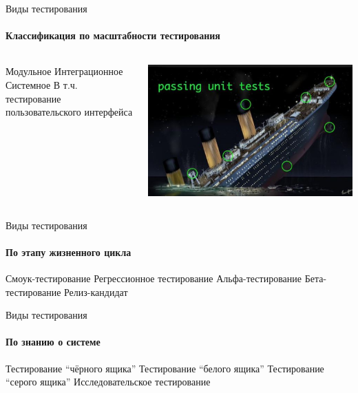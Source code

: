 \documentclass{../../slides-style}
\begin{document}
    \begin{frame}{Виды тестирования}
        \framesubtitle{Классификация по масштабности тестирования}
        \begin{columns}
            \begin{column}{0.4\textwidth}
                \begin{outline}
                    \1 Модульное
                    \1 Интеграционное
                    \1 Системное
                        \2 В т.ч. тестирование пользовательского интерфейса
                \end{outline}
            \end{column}
            \begin{column}{0.6\textwidth}
                \begin{center}
                    \includegraphics[width=\textwidth]{titanic.png}
                \end{center}
            \end{column}
        \end{columns}
    \end{frame}

    \begin{frame}{Виды тестирования}
        \framesubtitle{По этапу жизненного цикла}
        \begin{outline}
            \1 Смоук-тестирование
            \1 Регрессионное тестирование
            \1 Альфа-тестирование
            \1 Бета-тестирование
            \1 Релиз-кандидат
        \end{outline}
    \end{frame}

    \begin{frame}{Виды тестирования}
        \framesubtitle{По знанию о системе}
        \begin{outline}
            \1 Тестирование \enquote{чёрного ящика}
            \1 Тестирование \enquote{белого ящика}
            \1 Тестирование \enquote{серого ящика}
            \1 Исследовательское тестирование
        \end{outline}
    \end{frame}
\end{document}
